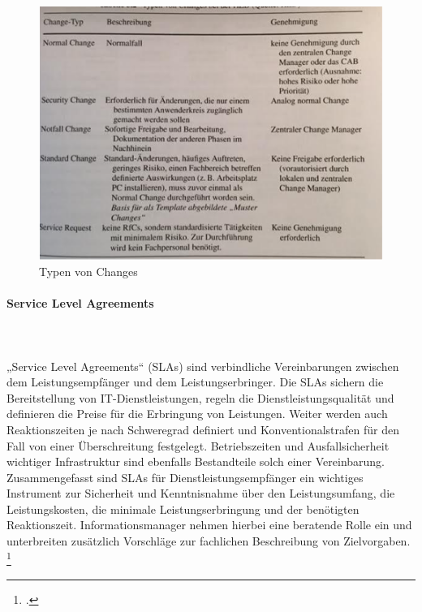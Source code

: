 \begin{figure}[h!]
	\centering
	\includegraphics[width=15cm]{kapitel/gruppe1_2/bilder/typen_von_changes} 
	\caption{Typen von Changes\protect\footnotemark}
	\label{fig_typenvonchange}
\end{figure}



\paragraph{Service Level Agreements}\mbox{}\\\\
„Service Level Agreements“ (SLAs) sind verbindliche Vereinbarungen zwischen dem Leistungsempfänger und dem Leistungserbringer. Die SLAs sichern die Bereitstellung von IT-Dienstleistungen, regeln die Dienstleistungsqualität und definieren die Preise für die Erbringung von Leistungen. Weiter werden auch Reaktionszeiten je nach Schweregrad definiert und Konventionalstrafen für den Fall von einer Überschreitung festgelegt. Betriebszeiten und Ausfallsicherheit wichtiger Infrastruktur sind ebenfalls Bestandteile solch einer Vereinbarung.
Zusammengefasst sind SLAs für Dienstleistungsempfänger ein wichtiges Instrument zur Sicherheit und Kenntnisnahme über den Leistungsumfang, die Leistungskosten, die minimale Leistungserbringung und der benötigten Reaktionszeit. Informationsmanager nehmen hierbei eine beratende Rolle ein und unterbreiten zusätzlich Vorschläge zur fachlichen Beschreibung von Zielvorgaben. \footcite[Vgl.][499]{heinrich_stelzer_2011}


